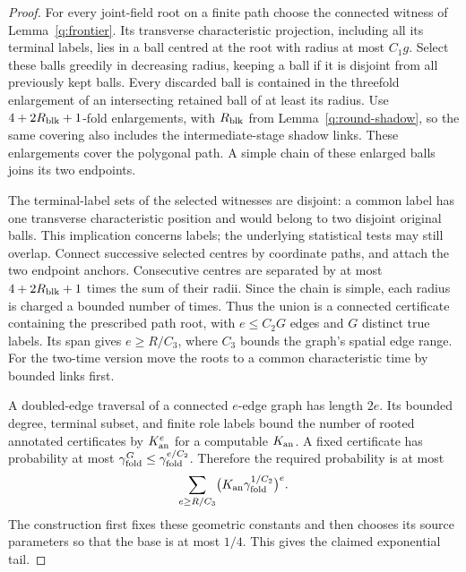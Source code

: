 \begin{proof}
For every joint-field root on a finite path choose the connected
witness of Lemma~\ref{q:frontier}. Its transverse characteristic
projection, including all its terminal labels, lies in a ball centred
at the root with radius at most \(C_1g\). Select these balls greedily
in decreasing radius, keeping a ball if it is disjoint from all
previously kept balls. Every discarded ball is contained in the
threefold enlargement of an intersecting retained ball of at least
its radius. Use \(4+2R_{\rm blk}+1\)-fold enlargements, with
\(R_{\rm blk}\) from Lemma~\ref{q:round-shadow}, so the same covering
also includes the intermediate-stage shadow links. These enlargements cover the polygonal
path. A simple chain of these enlarged balls joins its two endpoints.

The terminal-label sets of the selected witnesses are disjoint:
a common label has one transverse characteristic position and would
belong to two disjoint original balls. This implication concerns
labels; the underlying statistical tests may still overlap.
Connect successive selected centres by coordinate paths, and attach
the two endpoint anchors. Consecutive centres are separated by at
most \(4+2R_{\rm blk}+1\) times the sum of their radii. Since the chain is simple,
each radius is charged a bounded number of times. Thus the union is
a connected certificate containing the prescribed path root, with
\(e\le C_2G\) edges and \(G\) distinct true labels. Its span gives
\(e\ge R/C_3\), where \(C_3\) bounds the graph's spatial edge range.
For the two-time version move the roots to a common characteristic
time by bounded links first.

A doubled-edge traversal of a connected \(e\)-edge graph has length
\(2e\). Its bounded degree, terminal subset, and finite role labels
bound the number of rooted annotated certificates by \(K_{\rm an}^e\) for a
computable \(K_{\rm an}\). A fixed certificate has probability at most
\(\gamma_{\rm fold}^G\le\gamma_{\rm fold}^{e/C_2}\). Therefore the required probability is
at most
\begin{equation}\label{q:animal}
 \sum_{e\ge R/C_3}
       \bigl(K_{\rm an}\gamma_{\rm fold}^{1/C_2}\bigr)^e.
\end{equation}
The construction first fixes these geometric constants and then
chooses its source parameters so that the base is at most \(1/4\).
This gives the claimed exponential tail.
\end{proof}




